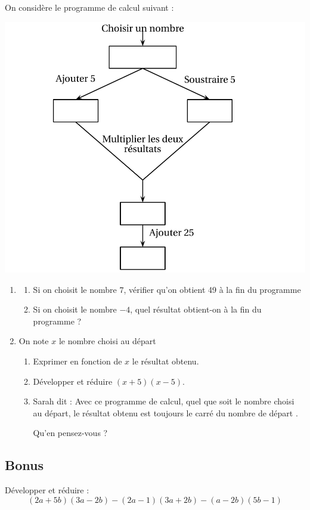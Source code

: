 \documentclass[12 pt]{extarticle}
\theoremstyle{plain}
\begin{document}
On considère le programme de calcul suivant :
\begin{center}
 \includegraphics[scale=.5]{Exo3}

\end{center}
\begin{enumerate}
\item 
	\begin{enumerate}
		\item Si on choisit le nombre $7$, vérifier qu'on obtient 49 à la fin du programme
		\item Si on choisit le nombre $- 4$, quel résultat obtient-on à la fin du programme ?
	\end{enumerate}	
\item On note $x$ le nombre choisi au départ
	\begin{enumerate}
		\item Exprimer en fonction de $x$ le résultat obtenu. 
		\item Développer et réduire $(x + 5)(x - 5)$.
		\item Sarah dit : \og Avec ce programme de calcul, quel que soit le nombre choisi au départ, le résultat obtenu est toujours le carré du nombre de départ \fg.
		
Qu'en pensez-vous ?
	\end{enumerate}
\end{enumerate}

\subsection*{Bonus}
Développer et réduire : \[(2a+5b)(3a-2b)-(2a-1)(3a+2b)-(a-2b)(5b-1)\]
 	
\end{document}
